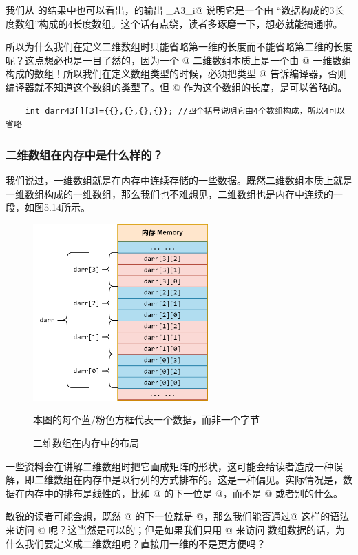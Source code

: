 我们从 \lstinline@typeid@ 的结果中也可以看出，\lstinline@darr@ 的输出 _A3_i@ 说明它是一个由 ``\lstinline@int@ 数据构成的3长度数组''构成的4长度数组。这个话有点绕，读者多琢磨一下，想必就能搞通啦。\par
所以为什么我们在定义二维数组时只能省略第一维的长度而不能省略第二维的长度呢？这点想必也是一目了然的，因为一个 \lstinline@int[4][3]@ 二维数组本质上是一个由 \lstinline@int[3]@ 一维数组构成的数组！所以我们在定义数组类型的时候，必须把类型 \lstinline@int[3]@ 告诉编译器，否则编译器就不知道这个数组的类型了。但 @ 作为这个数组的长度，是可以省略的。
\begin{lstlisting}
    int darr43[][3]={{},{},{},{}}; //四个括号说明它由4个数组构成，所以4可以省略
\end{lstlisting}\par
\subsubsection*{二维数组在内存中是什么样的？}
我们说过，一维数组就是在内存中连续存储的一些数据。既然二维数组本质上就是一维数组构成的一维数组，那么我们也不难想见，二维数组也是内存中连续的一段，如图5.14所示。\par
\begin{figure}[htbp]
    \centering
    \includegraphics[width=0.6\textwidth]{../images/generalized_parts/05_data_in_the_array_of_array.drawio.png}
    \caption{二维数组在内存中的布局}
    \footnotesize{本图的每个蓝/粉色方框代表一个数据，而非一个字节}
\end{figure}
一些资料会在讲解二维数组时把它画成矩阵的形状，这可能会给读者造成一种误解，即二维数组在内存中是以行列的方式排布的。这是一种偏见。实际情况是，数据在内存中的排布是线性的，比如 \lstinline@darr[0][3]@ 的下一位是 \lstinline@darr[1][0]@，而不是 \lstinline@darr[1][3]@ 或者别的什么。\par
敏锐的读者可能会想，既然 \lstinline@darr[0][3]@ 的下一位就是 \lstinline@darr[1][0]@，那么我们能否通过\linebreak\lstinline@darr[0][4]@ 这样的语法来访问 \lstinline@darr[1][0]@ 呢？这当然是可以的；但是如果我们只用 \lstinline@darr[0][i]@ 来访问 数组数据的话，为什么我们要定义成二维数组呢？直接用一维的不是更方便吗？\par
